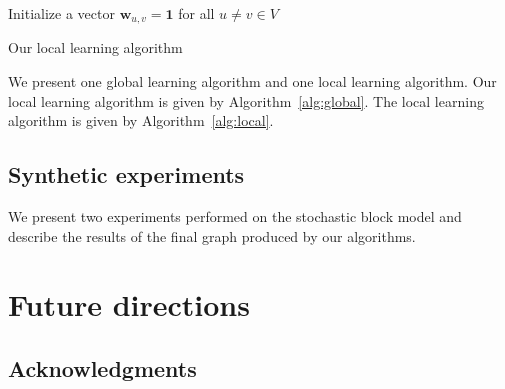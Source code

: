 \documentclass{article}[11pt]
\begin{document}
\begin{algorithm}[thb]
   \DontPrintSemicolon
   \label{alg:local}
   \SetAlgoLined

   Initialize a vector $\mathbf{w}_{u,v} = \mathbf{1}$ for all $u \neq v \in V$\;
   \caption{Our local learning algorithm}
\end{algorithm}

We present one global learning algorithm and one local learning algorithm. Our
local learning algorithm is given by Algorithm~\ref{alg:global}. The local
learning algorithm is given by Algorithm~\ref{alg:local}.

\subsection{Synthetic experiments}

We present two experiments performed on the stochastic block model and describe
the results of the final graph produced by our algorithms.


\section{Future directions}

\subsection*{Acknowledgments}



\end{document}
